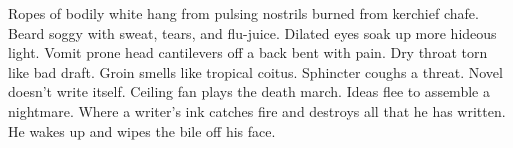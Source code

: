 \documentclass{article}
\begin{document}
\newline

Ropes of bodily white hang from pulsing nostrils burned from kerchief
chafe. Beard soggy with sweat, tears, and flu-juice. Dilated eyes soak
up more hideous light. Vomit prone head cantilevers off a back bent with
pain. Dry throat torn like bad draft. Groin smells like tropical coitus.
Sphincter coughs a threat. Novel doesn't write itself. Ceiling fan plays
the death march. Ideas flee to assemble a nightmare. Where a writer's
ink catches fire and destroys all that he has written. He wakes up and
wipes the bile off his face.
\end{document}
